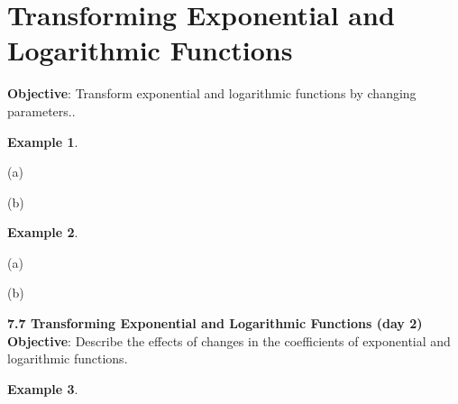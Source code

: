 \documentclass{report}
\theoremstyle{definition}
\newtheorem{example}{\bf Example}
\begin{document}
 \section{Transforming Exponential and Logarithmic Functions }
 \noindent \hfill\small \noindent \textbf{Objective}: Transform exponential and logarithmic functions by changing parameters.. \normalsize\\
 \setcounter{example}{0}
 \setcounter{definition}{0}

\begin{example}

\end{example}

\begin{minipage}[t]{0.45\linewidth}
(a)  
\end{minipage}
\hfill
\begin{minipage}[t]{0.45\linewidth}
(b) 
\end{minipage}

\vfill

\begin{example}

\end{example}

\begin{minipage}[t]{0.45\linewidth}
(a) 
\end{minipage}
\hfill
\begin{minipage}[t]{0.45\linewidth}
(b) 
\end{minipage}


\vfill
\vfill
 \noindent{}
 \newpage

\noindent\Large\textbf{7.7 Transforming Exponential and Logarithmic Functions (day 2)}\\
\noindent \hfill\small \noindent \textbf{Objective}: Describe the effects of changes in the coefficients of exponential and logarithmic functions. \normalsize\\

\begin{example}
\end{example}
\end{document}
